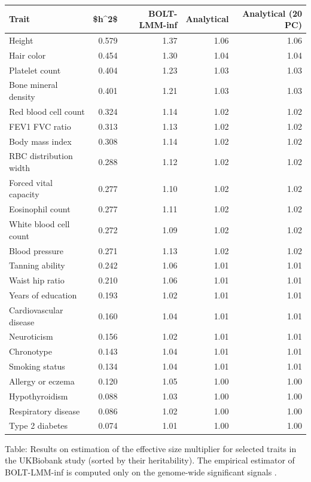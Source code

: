 \documentclass[]{book}
\begin{document}
\begin{tabular}{l|r|r|r|r}
\hline
Trait & \$h\textasciicircum{}2\$ & BOLT-LMM-inf & Analytical & Analytical (20 PC)\\
\hline
Height & 0.579 & 1.37 & 1.06 & 1.06\\
\hline
Hair color & 0.454 & 1.30 & 1.04 & 1.04\\
\hline
Platelet count & 0.404 & 1.23 & 1.03 & 1.03\\
\hline
Bone mineral density & 0.401 & 1.21 & 1.03 & 1.03\\
\hline
Red blood cell count & 0.324 & 1.14 & 1.02 & 1.02\\
\hline
FEV1 FVC ratio & 0.313 & 1.13 & 1.02 & 1.02\\
\hline
Body mass index & 0.308 & 1.14 & 1.02 & 1.02\\
\hline
RBC distribution width & 0.288 & 1.12 & 1.02 & 1.02\\
\hline
Forced vital capacity & 0.277 & 1.10 & 1.02 & 1.02\\
\hline
Eosinophil count & 0.277 & 1.11 & 1.02 & 1.02\\
\hline
White blood cell count & 0.272 & 1.09 & 1.02 & 1.02\\
\hline
Blood pressure & 0.271 & 1.13 & 1.02 & 1.02\\
\hline
Tanning ability & 0.242 & 1.06 & 1.01 & 1.01\\
\hline
Waist hip ratio & 0.210 & 1.06 & 1.01 & 1.01\\
\hline
Years of education & 0.193 & 1.02 & 1.01 & 1.01\\
\hline
Cardiovascular disease & 0.160 & 1.04 & 1.01 & 1.01\\
\hline
Neuroticism & 0.156 & 1.02 & 1.01 & 1.01\\
\hline
Chronotype & 0.143 & 1.04 & 1.01 & 1.01\\
\hline
Smoking status & 0.134 & 1.04 & 1.01 & 1.01\\
\hline
Allergy or eczema & 0.120 & 1.05 & 1.00 & 1.00\\
\hline
Hypothyroidism & 0.088 & 1.03 & 1.00 & 1.00\\
\hline
Respiratory disease & 0.086 & 1.02 & 1.00 & 1.00\\
\hline
Type 2 diabetes & 0.074 & 1.01 & 1.00 & 1.00\\
\hline
\end{tabular}

Table: \label{tab:ukbiobank} Results on estimation of the effective size
multiplier for selected traits in the UKBiobank study (sorted by their
heritability). The empirical estimator of BOLT-LMM-inf is computed only
on the genome-wide significant signals \citep{loh2018mixed}.
\end{document}
